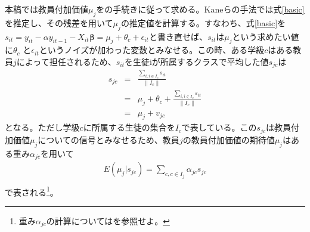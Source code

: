 \documentclass[a4paper,12pt]{article}
\begin{document}
本稿では教員付加価値$\mu_{j}$を\cite{kane2008estimating}の手続きに従って求める。Kaneらの手法では式\ref{basic}を推定し、その残差を用いて$\mu_{j}$の推定値を計算する。すなわち、式\ref{basic}を$s_{it} =   y_{it} - \alpha y_{it-1} -  X_{it}\boldsymbol{\beta} = \mu_j + \theta_{c} + \epsilon_{it} $と書き直せば、$s_{it}$は$\mu_{j}$という求めたい値に$\theta_{c}$ と$\epsilon_{it}$というノイズが加わった変数とみなせる。この時、ある学級$c$はある教員$j$によって担任されるため、$s_{it}$を生徒iが所属するクラスで平均した値$s_{jc}$は
\begin{eqnarray*}
s_{jc}  &=& \frac{\sum_{i, i \in I_{c}} s _ {it}}{\|I_{c}\|}\\
&=& \mu_{j} + \theta_{c} + \frac{\sum_{i, i \in I_{c}} \varepsilon _ {it}}{\|I_{c}\|} \\
&=& \mu_{j} + v_{jc}
\end{eqnarray*}
となる。ただし学級$c$に所属する生徒の集合を$I_c$で表している。この$s_{jc}$は教員付加価値$\mu_j$についての信号とみなせるため、教員$j$の教員付加価値の期待値$\mu_j$はある重み$\alpha_{jc}$を用いて
\begin{eqnarray*}
E(\mu_j|s_{jc}) = \sum_{c, c \in I_{j}} \alpha_{jc}  s_{jc}\\
\end{eqnarray*}
で表される\footnote{重み$\alpha_{jc}$の計算については\cite{kane2008estimating}を参照せよ。}。
\end{document}
